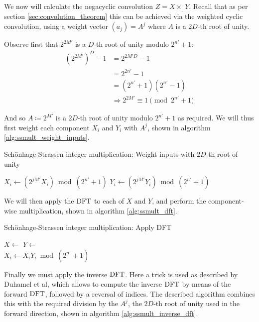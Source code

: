 We now will calculate the negacyclic convolution $Z = X \times_{\_} Y$. Recall
that as per section \ref{sec:convolution_theorem} this can be achieved via the
weighted cyclic convolution, using a weight vector $(a_j) = A^j$ where $A$ is a
$2D$-th root of unity.

Observe first that $2^{2M'}$ is a $D$-th root of unity modulo $2^{n'} + 1$:
\begin{align*}
		(2^{2M'})^D - 1 & = 2^{2M'D} - 1\\
						& = 2^{2n'} - 1 \\
						& = (2^{n'} + 1) (2^{n'} - 1) \\
						& \Rightarrow 2^{2M'} \equiv 1 \pmod{2^{n'} + 1}
\end{align*}

And so $A \coloneqq 2^{M'}$ is a $2D$-th root of unity modulo $2^{n'} + 1$ as
required. We will thus first weight each component $X_i$ and $Y_i$ with $A^j$,
shown in algorithm \ref{alg:ssmult_weight_inputs}.

\begin{algorithm}
		\caption{Schönhage-Strassen integer multiplication: Weight inputs with $2D$-th root of unity}
		\begin{algorithmic}[1]
				\State $X_i \gets (2^{jM'} X_i) \bmod (2^{n'} + 1)$
				\State $Y_i \gets (2^{jM'} Y_i) \bmod (2^{n'} + 1)$
				\EndFor
		\end{algorithmic}
		\label{alg:ssmult_weight_inputs}
\end{algorithm}

We will then apply the $\operatorname{DFT}$ to each of $X$ and $Y$, and perform the
component-wise multiplication, shown in algorithm \ref{alg:ssmult_dft}.

\begin{algorithm}
		\caption{Schönhage-Strassen integer multiplication: Apply DFT}
		\begin{algorithmic}[1]
				\State $X \gets$ 
				\State $Y \gets$ 
				\\
				\State $X_i \gets X_i Y_i \bmod(2^{n'} + 1)$
				\EndFor
		\end{algorithmic}
		\label{alg:ssmult_dft}
\end{algorithm}

Finally we must apply the inverse $\operatorname{DFT}$. Here a trick is used as described by
Duhamel et al\autocite{duhamelComputingInverseDFT1988}, which allows to compute
the inverse $\operatorname{DFT}$ by means of the forward $\operatorname{DFT}$, followed by a reversal of
indices. The described algorithm combines this with the required division by
the $A^j$, the $2D$-th root of unity used in the forward direction, shown in
algorithm \ref{alg:ssmult_inverse_dft}.

